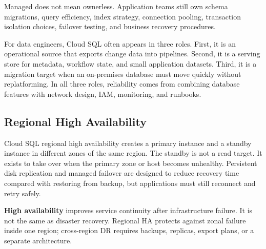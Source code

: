 \begin{notebox}
Managed does not mean ownerless. Application teams still own schema migrations, query efficiency, index strategy, connection pooling, transaction isolation choices, failover testing, and business recovery procedures.
\end{notebox}

For data engineers, Cloud SQL often appears in three roles. First, it is an operational source that exports change data into pipelines. Second, it is a serving store for metadata, workflow state, and small application datasets. Third, it is a migration target when an on-premises database must move quickly without replatforming. In all three roles, reliability comes from combining database features with network design, IAM, monitoring, and runbooks.

\subsection{Regional High Availability}
Cloud SQL regional high availability creates a primary instance and a standby instance in different zones of the same region. The standby is not a read target. It exists to take over when the primary zone or host becomes unhealthy. Persistent disk replication and managed failover are designed to reduce recovery time compared with restoring from backup, but applications must still reconnect and retry safely.

\begin{definitionbox}
\textbf{High availability} improves service continuity after infrastructure failure. It is not the same as disaster recovery. Regional HA protects against zonal failure inside one region; cross-region DR requires backups, replicas, export plans, or a separate architecture.
\end{definitionbox}

